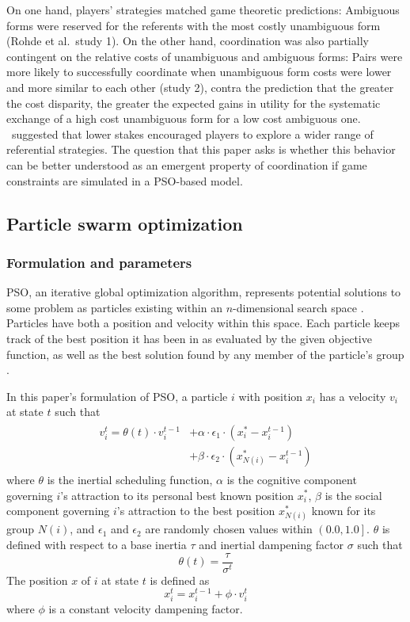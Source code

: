 \documentclass[a4paper,11pt]{article}
\begin{document}
On one hand, players' strategies matched game theoretic predictions: Ambiguous forms were reserved for the referents with the most costly unambiguous form (Rohde et al.\ study 1).  On the other hand, coordination was also partially contingent on the relative costs of unambiguous and ambiguous forms: Pairs were more likely to successfully coordinate when unambiguous form costs were lower and more similar to each other (study 2), contra the prediction that the greater the cost disparity, the greater the expected gains in utility for the systematic exchange of a high cost unambiguous form for a low cost ambiguous one. \citeauthor{rohde2012}\ suggested that lower stakes encouraged players to explore a wider range of referential strategies. The question that this paper asks is whether this behavior can be better understood as an emergent property of coordination if game constraints are simulated in a PSO-based model.


\subsection{Particle swarm optimization}
\subsubsection{Formulation and parameters}
\label{sec:2.2.3}
PSO, an iterative global optimization algorithm, represents potential solutions to some problem as particles existing within an $n$-dimensional search space \cite{kennedy1995}. Particles have both a position and velocity within this space. Each particle keeps track of the best position it has been in as evaluated by the given objective function, as well as the best solution found by any member of the particle's group \cite{chong2013}. 

In this paper's formulation of PSO, a particle $i$ with position $x_i$ has a velocity $v_i$ at state $t$ such that 
\begin{multline} \label{eq:pso_vel}
\begin{split}
v_i^t = \theta(t) \cdot v_i^{t-1} & + \alpha \cdot \epsilon_1 \cdot (x_i^* - x_i^{t-1}) \\
                                  & + \beta \cdot \epsilon_2 \cdot (x_{N(i)}^* - x_i^{t-1})
\end{split}
\end{multline}
where $\theta$ is the inertial scheduling function, $\alpha$ is the cognitive component governing $i$'s attraction to its personal best known position $x_i^*$, $\beta$ is the social component governing $i$'s attraction to the best position $x_{N(i)}^*$ known for its group $N(i)$, and $\epsilon_1$ and $\epsilon_2$ are randomly chosen values within $\left(0.0, 1.0\right]$. $\theta$ is defined with respect to a base inertia $\tau$ and inertial dampening factor $\sigma$ such that
\begin{equation}
\theta(t) = \frac{\tau}{\sigma^t} 
\end{equation}
The position $x$ of $i$ at state $t$ is defined as
\begin{equation}
x_i^t = x_i^{t-1} + \phi \cdot v_i^t 
\end{equation}
where $\phi$ is a constant velocity dampening factor.
\end{document}
